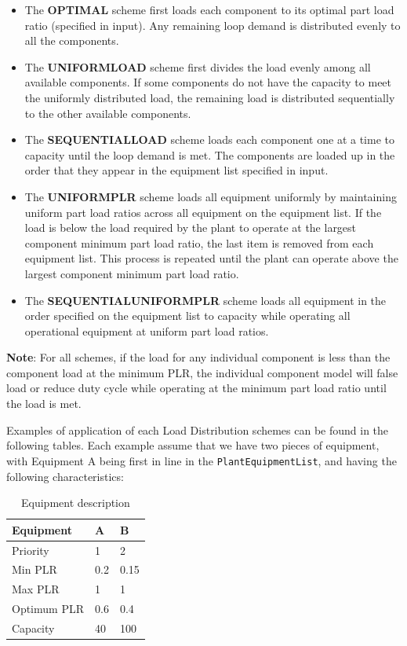 \begin{itemize}
\item
    The \textbf{OPTIMAL} scheme first loads each component to its optimal part load ratio (specified in input). Any remaining loop demand is distributed evenly to all the components.
\item
    The \textbf{UNIFORMLOAD} scheme first divides the load evenly among all available components.
    If some components do not have the capacity to meet the uniformly distributed load, the remaining load is distributed sequentially to the other available components.
\item
    The \textbf{SEQUENTIALLOAD} scheme loads each component one at a time to capacity until the loop demand is met.
    The components are loaded up in the order that they appear in the equipment list specified in input.
\item
    The \textbf{UNIFORMPLR} scheme loads all equipment uniformly by maintaining uniform part load ratios across all equipment on the equipment list.
    If the load is below the load required by the plant to operate at the largest component minimum part load ratio, the last item is removed from each equipment list.
    This process is repeated until the plant can operate above the largest component minimum part load ratio.
\item
    The \textbf{SEQUENTIALUNIFORMPLR} scheme loads all equipment in the order specified on the equipment list to capacity while operating all operational equipment at uniform part load ratios.
\end{itemize}

\textbf{Note}: For all schemes, if the load for any individual component is less than the component load at the minimum PLR, the individual component model will false load or reduce duty cycle while operating at the minimum part load ratio until the load is met.

Examples of application of each Load Distribution schemes can be found in the following tables.
Each example assume that we have two pieces of equipment, with Equipment A being first in line in the \lstinline!PlantEquipmentList!, and having the following characteristics:

\begin{table}[htbp]
    \centering
    \caption{Equipment description}
    \label{tab:example-load-distribution-eq}
\begin{tabular}{|l|l|l|}
\hline
Equipment   & A   & B   \\ \hline
Priority    & 1   & 2   \\ \hline
Min PLR     & 0.2 & 0.15 \\ \hline
Max PLR     & 1   & 1   \\ \hline
Optimum PLR & 0.6 & 0.4 \\ \hline
Capacity    & 40  & 100 \\ \hline
\end{tabular}
\end{table}

